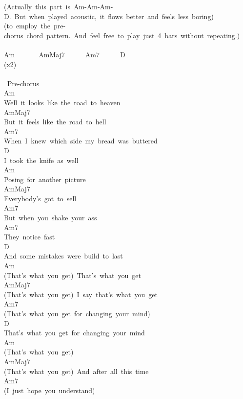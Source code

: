 {(Actually\ this\ part\ is\ Am-Am-Am-D.\ But\ when\ played\ acoustic,\ it\ flows\ better\ and\ feels\ less\ boring)\\
(to\ employ\ the\ pre-chorus\ chord\ pattern.\ And\ feel\ free\ to\ play\ just\ 4\ bars\ without\ repeating.)\\
\\
Am\ \ \ \ \ \ \ AmMaj7\ \ \ \ \ \ Am7\ \ \ \ \ \ D\\
(x2)\\
\\
\lbrack\ Pre-chorus\rbrack\\
Am\\
Well\ it\ looks\ like\ the\ road\ to\ heaven\\
AmMaj7\\
But\ it\ feels\ like\ the\ road\ to\ hell\\
Am7\\
When\ I\ knew\ which\ side\ my\ bread\ was\ buttered\\
D\\
I\ took\ the\ knife\ as\ well\\
Am\\
Posing\ for\ another\ picture\\
AmMaj7\\
Everybody's\ got\ to\ sell\\
Am7\\
But\ when\ you\ shake\ your\ ass\\
Am7\\
They\ notice\ fast\\
D\\
And\ some\ mistakes\ were\ build\ to\ last\\
Am\\
(That's\ what\ you\ get)\ That's\ what\ you\ get\\
AmMaj7\\
(That's\ what\ you\ get)\ I\ say\ that's\ what\ you\ get\\
Am7\\
(That's\ what\ you\ get\ for\ changing\ your\ mind)\ \\
D\\
That's\ what\ you\ get\ for\ changing\ your\ mind\ \\
Am\\
(That's\ what\ you\ get)\\
AmMaj7\\
(That's\ what\ you\ get)\ And\ after\ all\ this\ time\\
Am7\\
(I\ just\ hope\ you\ understand)\\
}
